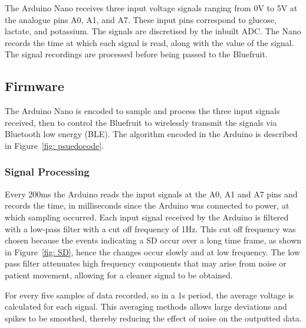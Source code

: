 The Arduino Nano receives three input voltage signals ranging from 0V to 5V at the analogue pins A0, A1, and A7. These input pins correspond to glucose, lactate, and potassium. The signals are discretised by the inbuilt ADC. The Nano records the time at which each signal is read, along with the value of the signal. The signal recordings are processed before being passed to the Bluefruit.



\subsection{Firmware}
The Arduino Nano is encoded to sample and process the three input signals received, then to control the Bluefruit to wirelessly transmit the signals via Bluetooth low energy (BLE). The algorithm encoded in the Arduino is described in Figure~\ref{fig: psuedocode}.


\subsubsection{Signal Processing}
Every 200ms the Arduino reads the input signals at the A0, A1 and A7 pins and records the time, in milliseconds since the Arduino was connected to power, at which sampling occurred. Each input signal received by the Arduino is filtered with a low-pass filter with a cut off frequency of 1Hz. This cut off frequency was chosen because the events indicating a SD occur over a long time frame, as shown in Figure~\ref{fig: SD}, hence the changes occur slowly and at low frequency. The low pass filter attenuates high frequency components that may arise from noise or patient movement, allowing for a cleaner signal to be obtained.

For every five samples of data recorded, so in a 1s period, the average voltage is calculated for each signal. This averaging methods allows large deviations and spikes to be smoothed, thereby reducing the effect of noise on the outputted data.

